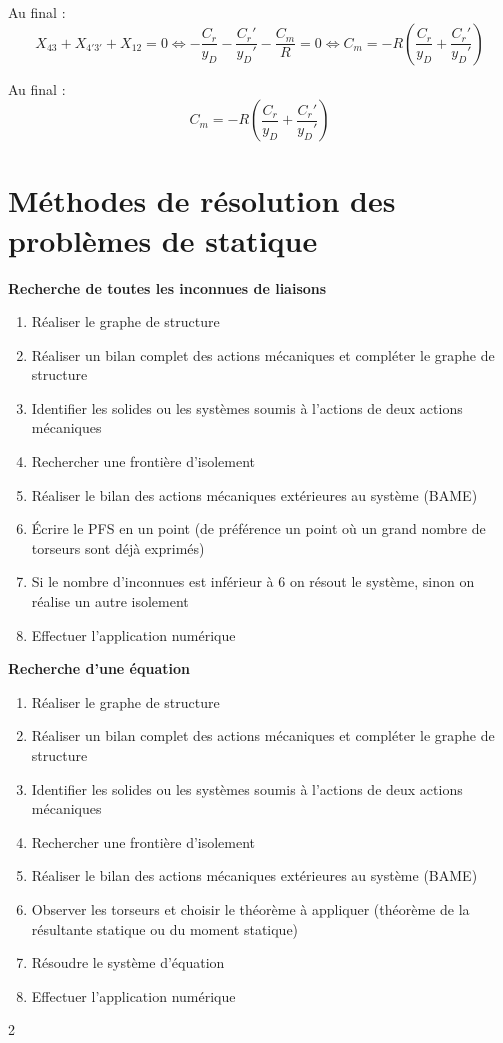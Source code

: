 \documentclass[11pt,oneside]{article}
\begin{document}
Au final :
$$
X_{43}+X_{4'3'}+X_{12}=0 
\Longleftrightarrow
-\dfrac{C_r}{y_D}-\dfrac{C_r'}{y_D'}-\dfrac{C_m}{R}=0 
\Longleftrightarrow
C_m=-R\left(\dfrac{C_r}{y_D}+\dfrac{C_r'}{y_D'}\right)
$$

\begin{resultat}
Au final :
$$
C_m=-R\left(\dfrac{C_r}{y_D}+\dfrac{C_r'}{y_D'}\right)
$$
\end{resultat}


\section{Méthodes de résolution des problèmes de statique}
\begin{methode}
\textbf{Recherche de toutes les inconnues de liaisons}

\begin{enumerate}
\item Réaliser le graphe de structure
\item Réaliser un bilan complet des actions mécaniques et compléter le graphe de structure
\item Identifier les solides ou les systèmes soumis à l'actions de deux actions mécaniques
\item Rechercher une frontière d'isolement
\item Réaliser le bilan des actions mécaniques extérieures au système (BAME)
\item Écrire le PFS en un point (de préférence un point où un grand nombre de torseurs sont déjà exprimés)
\item Si le nombre d'inconnues est inférieur à 6 on résout le système, sinon on réalise un autre isolement
\item Effectuer l'application numérique
\end{enumerate}
\end{methode}

\begin{methode}
\textbf{Recherche d'une équation}

\begin{enumerate}
\item Réaliser le graphe de structure
\item Réaliser un bilan complet des actions mécaniques et compléter le graphe de structure
\item Identifier les solides ou les systèmes soumis à l'actions de deux actions mécaniques
\item Rechercher une frontière d'isolement
\item Réaliser le bilan des actions mécaniques extérieures au système (BAME)
\item Observer les torseurs et choisir le théorème à appliquer (théorème de la résultante statique ou du moment statique)
\item Résoudre le système d'équation
\item Effectuer l'application numérique
\end{enumerate}
\end{methode}


\begin{thebibliography}{2}
\end{thebibliography}
\end{document}
